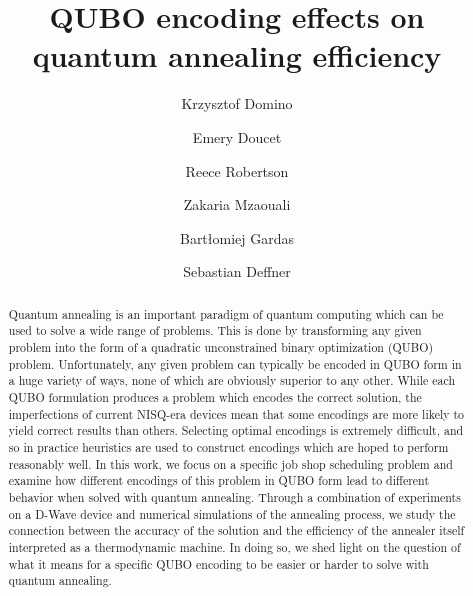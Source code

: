 \documentclass[aps,pra,amsmath,amssymb,amsfonts,lengthcheck,twocolumn,superscriptaddress]{revtex4-1}
\begin{document}
\title{QUBO encoding effects on quantum annealing efficiency}

\author{Krzysztof Domino}


\author{Emery Doucet}

\author{Reece Robertson}

\author{Zakaria Mzaouali}

\author{Bartłomiej Gardas}

\author{Sebastian Deffner}

\begin{abstract}
Quantum annealing is an important paradigm of quantum computing which can be used to solve a wide range of problems.
This is done by transforming any given problem into the form of a quadratic unconstrained binary optimization (QUBO) problem. 
Unfortunately, any given problem can typically be encoded in QUBO form in a huge variety of ways, none of which are obviously superior to any other.
While each QUBO formulation produces a problem which encodes the correct solution, the imperfections of current NISQ-era devices mean that some encodings are more likely to yield correct results than others.
Selecting optimal encodings is extremely difficult, and so in practice heuristics are used to construct encodings which are hoped to perform reasonably well.
In this work, we focus on a specific job shop scheduling problem and examine how different encodings of this problem in QUBO form lead to different behavior when solved with quantum annealing. 
Through a combination of experiments on a D-Wave device and numerical simulations of the annealing process, we study the connection between the accuracy of the solution and the efficiency of the annealer itself interpreted as a thermodynamic machine. 
In doing so, we shed light on the question of what it means for a specific QUBO encoding to be easier or harder to solve with quantum annealing. 
\end{abstract}
\end{document}

